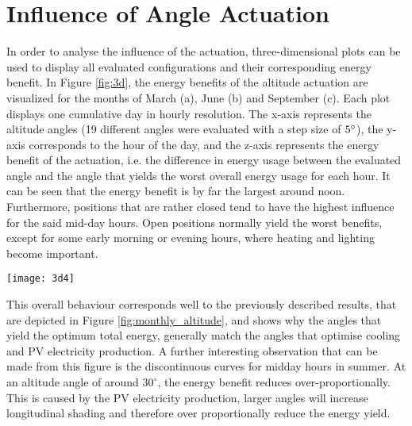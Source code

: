 	


\section{Influence of Angle Actuation}
\label{s:actuation}
	In order to analyse the influence of the actuation, three-dimensional plots can be used to display all evaluated configurations and their corresponding energy benefit. In Figure \ref{fig:3d}, the energy benefits of the altitude actuation are visualized for the months of March (a), June (b) and September (c). Each plot displays one cumulative day in hourly resolution. The x-axis  represents the altitude angles (19 different angles were evaluated with a step size of $5\degree$), the y-axis corresponds to the hour of the day, and the z-axis represents the energy benefit of the actuation, i.e. the difference in energy usage between the evaluated angle and the angle that yields the worst overall energy usage for each hour. It can be seen that the energy benefit is by far the largest around noon. Furthermore, positions that are rather closed tend to have the highest influence for the said mid-day hours. Open positions normally yield the worst benefits, except for some early morning or evening hours, where heating and lighting become important. 


	\begin{figure*}[h!]
		\begin{center}
		\texttt{[image: 3d4]}
		\caption{Energy benefits of the altitude actuation for the months of March (a), June (b) and September (c). Each plot displays one cumulative day in hourly resolution. The x-axis  represents the altitude angles, the y-axis corresponds to the hour of the day, and the z-axis represents the energy benefit of the actuation, i.e. the difference in energy usage between the evaluated angle and the angle that yields the worst overall energy usage for each hour.}
		\label{fig:3d}
		\end{center}
	\end{figure*}

	This overall behaviour corresponds well to the previously described results, that are depicted in Figure \ref{fig:monthly_altitude}, and shows why the angles that yield the optimum total energy, generally match the angles that optimise cooling and PV electricity production. A further interesting observation that can be made from this figure is the discontinuous curves for midday hours in summer. At an altitude angle of around $30^{\circ}$, the energy benefit reduces over-proportionally. This is caused by the PV electricity production, larger angles will increase longitudinal shading and therefore over proportionally reduce the energy yield. 


